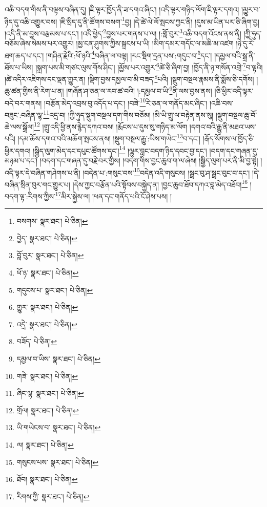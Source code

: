 འཆི་བདག་གིས་ནི་བལྟས་བཞིན་དུ། །ཇི་ལྟར་ཁྱོད་ནི་ཟ་དགའ་ཞིང་། །འདི་ལྟར་གཉིད་ལོག་ཇི་ལྟར་དགའ། །མྱུར་བ་ཉིད་དུ་འཆི་འགྱུར་བས། །ཇི་སྲིད་དུ་ནི་ཚོགས་བསག་\footnote{བསགས་  སྣར་ཐང་།  པེ་ཅིན། }བྱ། །དེ་ཚེ་ལེ་ལོ་སྤངས་ཀྱང་ནི། །དུས་མ་ཡིན་པར་ཅི་ཞིག་བྱ། །འདི་ནི་མ་བྱས་བརྩམས་པ་དང་། །འདི་ཕྱེད་\footnote{བྱེད་  སྣར་ཐང་།  པེ་ཅིན། }བྱས་པར་གནས་པ་ལ། །:གློ་བུར་\footnote{བློ་བུར་  སྣར་ཐང་།  པེ་ཅིན། }འཆི་བདག་འོངས་ནས་ནི། །ཀྱི་ཧུད་བཅོམ་ཞེས་སེམས་པར་འགྱུར། །མྱ་ངན་ཤུགས་ཀྱིས་སྐྲངས་པ་ཡི། །མིག་དམར་གདོང་ལ་མཆི་མ་འཛག །ཉེ་དུ་རེ་ཐག་ཆད་པ་དང་། །གཤིན་རྗེའི་:ཕོ་ཉའི་\footnote{ཕོ་ཉ་  སྣར་ཐང་།  པེ་ཅིན། }བཞིན་ལ་བལྟ། །རང་སྡིག་དྲན་པས་:གདུང་བ་\footnote{གདུངས་པ་  སྣར་ཐང་།  པེ་ཅིན། }དང་། །དམྱལ་བའི་སྒྲ་ནི་ཐོས་པ་ཡིས། །སྐྲག་པས་མི་གཙང་ལུས་གོས་ཤིང་། །མྱོས་པར་འགྱུར་\footnote{གྱུར་  སྣར་ཐང་།  པེ་ཅིན། }ཚེ་ཅི་ཞིག་བྱ། །ཁྱོད་ནི་ཉ་གསོན་འགྲེ་\footnote{འདྲེ་  སྣར་ཐང་།  པེ་ཅིན། }བ་ལྟའི། །ཚེ་འདིར་འཇིགས་དང་ལྡན་གྱུར་ན། །སྡིག་བྱས་དམྱལ་བ་མི་བཟད་\footnote{བཟོད་  པེ་ཅིན། }པའི། །སྡུག་བསྔལ་རྣམས་ནི་སྨོས་ཅི་དགོས། །ཆུ་ཚན་གྱིས་ནི་རེག་པ་ན། །གཞོན་ཤ་ཅན་ལ་རབ་ཚ་བའི། །:དམྱལ་བ་ཡི་\footnote{དམྱལ་བ་ཡིས་  སྣར་ཐང་།  པེ་ཅིན། }ནི་ལས་བྱས་ནས། །ཅི་ཕྱིར་འདི་ལྟར་བདེ་བར་གནས། །བརྩོན་མེད་འབྲས་བུ་འདོད་པ་དང་། །བཟེ་\footnote{གཟེ་  སྣར་ཐང་།  པེ་ཅིན། }རེ་ཅན་ལ་གནོད་མང་ཞིང་། །འཆི་བས་བཟུང་:བཞིན་ལྷ་\footnote{ཞིང་ལྷ་  སྣར་ཐང་།  པེ་ཅིན། }འདྲ་བ། །ཀྱི་ཧུད་སྡུག་བསྔལ་དག་གིས་བཅོམ། །མི་ཡི་གྲུ་ལ་བརྟེན་ནས་སུ། །སྡུག་བསྔལ་ཆུ་བོ་ཆེ་ལས་སྒྲོལ།\footnote{གྲོལ།  སྣར་ཐང་།  པེ་ཅིན། } །གྲུ་འདི་ཕྱི་ནས་རྙེད་དཀའ་བས། །རྨོངས་པ་དུས་སུ་གཉིད་མ་ལོག །དགའ་བའི་རྒྱུ་ནི་མཐའ་ཡས་པའི། །དམ་ཆོས་དགའ་བའི་མཆོག་སྤངས་ནས། །སྡུག་བསྔལ་རྒྱུ་:ཡིས་གཡེང་\footnote{ཡི་གཡེངས་བ་  སྣར་ཐང་།  པེ་ཅིན། }བ་དང་། །རྒོད་སོགས་ལ་ཁྱོད་ཅི་ཕྱིར་དགའ། །སྒྱིད་ལུག་མེད་དང་དཔུང་ཚོགས་དང་།\footnote{ལ།  སྣར་ཐང་།  པེ་ཅིན། } །ལྷུར་བླང་བདག་ཉིད་དབང་བྱ་དང་། །བདག་དང་གཞན་དུ་མཉམ་པ་དང་། །བདག་དང་གཞན་དུ་བརྗེ་བར་གྱིས། །བདག་གིས་བྱང་ཆུབ་ག་ལ་ཞེས། །སྒྱིད་ལུག་པར་ནི་མི་བྱ་སྟེ། །འདི་ལྟར་དེ་བཞིན་གཤེགས་པ་ནི། །བདེན་པ་:གསུང་བས་\footnote{གསུངས་པས་  སྣར་ཐང་།  པེ་ཅིན། }བདེན་འདི་གསུངས། །སྦྲང་བུ་ཤ་སྦྲང་བུང་བ་དང་། །དེ་བཞིན་སྲིན་བུར་གང་གྱུར་པ། །དེས་ཀྱང་བརྩོན་པའི་སྟོབས་བསྐྱེད་ན། །བྱང་ཆུབ་ཐོབ་དཀའ་བླ་མེད་འཐོབ།\footnote{ཐོབ།  སྣར་ཐང་།  པེ་ཅིན། } །བདག་ལྟ་:རིགས་ཀྱིས་\footnote{རིགས་ཀྱི་  སྣར་ཐང་།  པེ་ཅིན། }མིར་སྐྱེས་ལ། །ཕན་དང་གནོད་པའི་ངོ་ཤེས་པས། །
